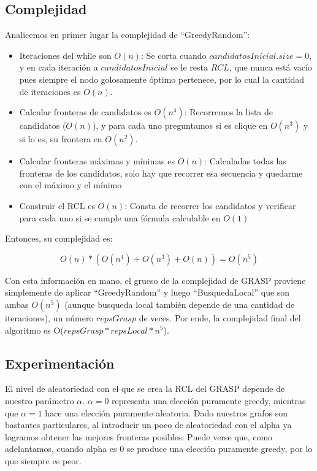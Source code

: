 \subsection{Complejidad}

Analicemos en primer lugar la complejidad de ``GreedyRandom'':
\begin{itemize}
    \item Iteraciones del while son $O(n)$: Se corta cuando $candidatosInicial.size = 0$, y en cada iteración a $candidatosInicial$ se le resta $RCL$, que nunca está vacío pues siempre el nodo golosamente óptimo pertenece, por lo cual la cantidad de iteraciones es $O(n)$.
    \item Calcular fronteras de candidatos es $O(n^4)$: Recorremos la lista de candidatos ($O(n)$), y para cada uno preguntamos si es clique en $O(n^3)$ y si lo es, su frontera en $O(n^2)$.
    \item Calcular fronteras máximas y mínimas es $O(n)$: Calculadas todas las fronteras de los candidatos, solo hay que recorrer esa secuencia y quedarme con el máximo y el mínimo
    \item Construir el RCL es $O(n)$: Consta de recorrer los candidatos y verificar para cada uno si se cumple una fórmula calculable en $O(1)$
\end{itemize}

Entonces, su complejidad es:

$$ O(n) * (O(n^4) + O(n^3) + O(n)) = O(n^5)$$

Con esta información en mano, el grueso de la complejidad de GRASP proviene simplemente de aplicar ``GreedyRandom'' y luego ``BusquedaLocal'' que son ambas $O(n^5)$ (aunque busqueda local también depende de una cantidad de iteraciones), un número $repsGrasp$ de veces. Por ende, la complejidad final del algoritmo es O($repsGrasp * repsLocal * n^5$).


\subsection{Experimentación}

El nivel de aleatoriedad con el que se crea la RCL del GRASP depende de nuestro parámetro $\alpha$. $\alpha = 0$ representa una elección puramente greedy, mientras que $\alpha = 1$ hace una elección puramente aleatoria. Dado nuestros grafos son bastantes particulares, al introducir un poco de aleatoriedad con el alpha ya logramos obtener las mejores fronteras posibles. Puede verse que, como adelantamos, cuando alpha es 0 se produce una elección puramente greedy, por lo que siempre es peor. \\

